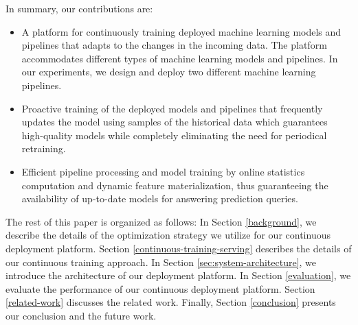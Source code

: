 In summary, our contributions are:
\begin{itemize}
\item A platform for continuously training deployed machine learning models and pipelines that adapts to the changes in the incoming data. The platform accommodates different types of machine learning models and pipelines. In our experiments, we design and deploy two different machine learning pipelines.
\item Proactive training of the deployed models and pipelines that frequently updates the model using samples of the historical data which guarantees high-quality models while completely eliminating the need for periodical retraining.
\item Efficient pipeline processing and model training by online statistics computation and dynamic feature materialization, thus guaranteeing the availability of up-to-date models for answering prediction queries.
\end{itemize}

The rest of this paper is organized as follows:
In Section \ref{background}, we describe the details of the optimization strategy we utilize for our continuous deployment platform.
Section \ref{continuous-training-serving} describes the details of our continuous training approach.
In Section \ref{sec:system-architecture}, we introduce the architecture of our deployment platform.
In Section \ref{evaluation}, we evaluate the performance of our continuous deployment platform.
Section \ref {related-work} discusses the related work.
Finally, Section \ref{conclusion} presents our conclusion and the future work.